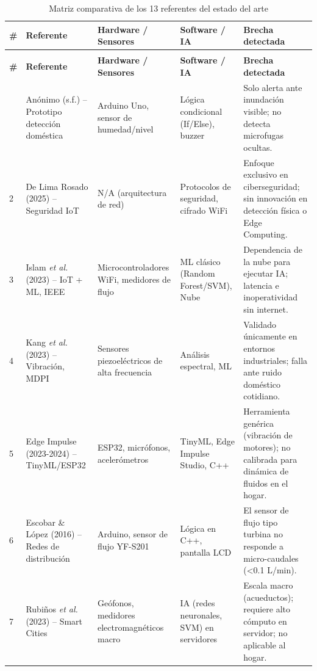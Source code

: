 \documentclass[12pt,a4paper]{article}
\begin{document}
\begin{longtable}{>{\small}p{0.4cm} >{\small}p{3.8cm} >{\small}p{2.4cm} >{\small}p{2.4cm} >{\small}p{4.2cm}}
\caption{Matriz comparativa de los 13 referentes del estado del arte} \label{tab:matriz-comparativa} \\
\toprule
\textbf{\#} & \textbf{Referente} & \textbf{Hardware / Sensores} & \textbf{Software / IA} & \textbf{Brecha detectada} \\
\midrule
\endfirsthead
\multicolumn{5}{c}{\small\textit{(continúa en la siguiente página)}} \\
\toprule
\textbf{\#} & \textbf{Referente} & \textbf{Hardware / Sensores} & \textbf{Software / IA} & \textbf{Brecha detectada} \\
\midrule
\endhead
\bottomrule
\endlastfoot
1 & Anónimo (s.f.) -- Prototipo detección doméstica & Arduino Uno, sensor de humedad/nivel & Lógica condicional (If/Else), buzzer & Solo alerta ante inundación visible; no detecta microfugas ocultas. \\[0.4em]
2 & De Lima Rosado (2025) -- Seguridad IoT & N/A (arquitectura de red) & Protocolos de seguridad, cifrado WiFi & Enfoque exclusivo en ciberseguridad; sin innovación en detección física o Edge Computing. \\[0.4em]
3 & Islam \textit{et al.} (2023) -- IoT + ML, IEEE & Microcontroladores WiFi, medidores de flujo & ML clásico (Random Forest/SVM), Nube & Dependencia de la nube para ejecutar IA; latencia e inoperatividad sin internet. \\[0.4em]
4 & Kang \textit{et al.} (2023) -- Vibración, MDPI & Sensores piezoeléctricos de alta frecuencia & Análisis espectral, ML & Validado únicamente en entornos industriales; falla ante ruido doméstico cotidiano. \\[0.4em]
5 & Edge Impulse (2023-2024) -- TinyML/ESP32 & ESP32, micrófonos, acelerómetros & TinyML, Edge Impulse Studio, C++ & Herramienta genérica (vibración de motores); no calibrada para dinámica de fluidos en el hogar. \\[0.4em]
6 & Escobar \& López (2016) -- Redes de distribución & Arduino, sensor de flujo YF-S201 & Lógica en C++, pantalla LCD & El sensor de flujo tipo turbina no responde a micro-caudales (\textless{}0.1 L/min). \\[0.4em]
7 & Rubiños \textit{et al.} (2023) -- Smart Cities & Geófonos, medidores electromagnéticos macro & IA (redes neuronales, SVM) en servidores & Escala macro (acueductos); requiere alto cómputo en servidor; no aplicable al hogar. \\[0.4em]

\end{longtable}
\end{document}
